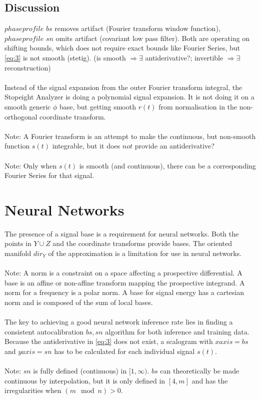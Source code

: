 \documentclass{report}
\begin{document}
\subsection{Discussion}
$phaseprofile$ $bs$ removes artifact (Fourier transform window function), $phaseprofile$ $sn$ omits artifact (covariant low pass filter). Both are operating on shifting bounds, which does not require exact bounds like Fourier Series, but \eqref{eq:3} is not smooth (stetig). (is smooth $\Rightarrow \exists$ antiderivative?; invertible $\Rightarrow \exists$ reconstruction)\\\\
Instead of the signal expansion from the outer Fourier transform integral, the Stopeight Analyzer is doing a polynomial signal expansion. It is not doing it on a smooth generic $\phi$ base, but getting smooth $r(t)$ from normalisation in the non-orthogonal coordinate transform.\\\\
Note: A Fourier transform is an attempt to make the continuous, but non-smooth function $s(t)$ integrable, but it does $not$ provide an antiderivative?\\\\
Note: Only when $s(t)$ is smooth (and continuous), there can be a corresponding Fourier Series for that signal.

\section{Neural Networks}
The presence of a signal base is a requirement for neural networks. Both the points in $Y\cup Z$ and the coordinate transforms provide bases. The oriented manifold $dir_{Y}$ of the approximation is a limitation for use in neural networks.\\\\
Note: A norm is a constraint on a space affecting a prospective differential. A base is an affine or non-affine transform mapping the prospective integrand. A norm for a frequency is a polar norm. A base for signal energy has a cartesian norm and is composed of the sum of local bases.\\\\
The key to achieving a good neural network inference rate lies in finding a consistent autocalibration $bs,sn$ algorithm for both inference and training data. Because the antiderivative in \eqref{eq:3} does not exist, a scalogram with $xaxis=bs$ and $yaxis=sn$ has to be calculated for each individual signal $s(t)$.\\\\
Note: $sn$ is fully defined (continuous) in $[1,\infty)$. $bs$ can theoretically be made continuous by interpolation, but it is only defined in $[4,m]$ and has the irregularities when $(m\mod n) > 0$.
\end{document}
